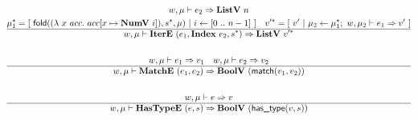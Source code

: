 \begin{gather*}
  w, \mu \vdash e_2 \Rightarrow \listv ~ n \\
  \seq{\mu_1} =
    [ ~
      \fold(
        (\lambda ~ x ~ acc. ~ acc[x \mapsto \numv ~ i]),
        \seq{s},
        \mu
      )
    ~ | ~
      i \leftarrow [0 ~ .. ~ n-1]
    ~ ]
  \quad
  \seq{v'} =
    [ ~
      v'
    ~ | ~
      \mu_2 \leftarrow \seq {\mu_1}; ~ w, \mu_2 \vdash e_1 \Rightarrow v'
    ~ ] \\
  \hline
  w, \mu \vdash \itere ~ (e_1, \listidxiter ~ e_2, \seq{s}) \Rightarrow \listv ~ \seq{v'} \\
%
\newline \\
  w, \mu \vdash e_1 \Rightarrow v_1 \quad
  w, \mu \vdash e_2 \Rightarrow v_2 \\
  \hline
  w, \mu \vdash \matche ~ (e_1, e_2) \Rightarrow \boolv ~ (\match(v_1, v_2)) \\
%
\newline \\
  w, \mu \vdash e \Rightarrow v \\
  \hline
  w, \mu \vdash \hastypee ~ (e, s) \Rightarrow \boolv ~ (\hastype(v, s)) \\
\end{gather*}

